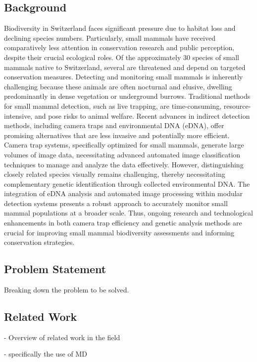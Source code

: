     \subsection{Background}
    Biodiversity in Switzerland faces significant pressure due to habitat loss and declining species numbers.
    Particularly, small mammals have received comparatively less attention in conservation research and public perception, despite their crucial ecological roles.
    Of the approximately 30 species of small mammals native to Switzerland, several are threatened and depend on targeted conservation measures.
    Detecting and monitoring small mammals is inherently challenging because these animals are often nocturnal and elusive, dwelling predominantly in dense vegetation or underground burrows.
    Traditional methods for small mammal detection, such as live trapping, are time-consuming, resource-intensive, and pose risks to animal welfare.
    Recent advances in indirect detection methods, including camera traps and environmental DNA (eDNA), offer promising alternatives that are less invasive and potentially more efficient.
    Camera trap systems, specifically optimized for small mammals, generate large volumes of image data, necessitating advanced automated image classification techniques to manage and analyze the data effectively.
    However, distinguishing closely related species visually remains challenging, thereby necessitating complementary genetic identification through collected environmental DNA.
    The integration of eDNA analysis and automated image processing within modular detection systems presents a robust approach to accurately monitor small mammal populations at a broader scale.
    Thus, ongoing research and technological enhancements in both camera trap efficiency and genetic analysis methods are crucial for improving small mammal biodiversity assessments and informing conservation strategies.

    \subsection{Problem Statement}

    Breaking down the problem to be solved.

    \subsection{Related Work}

    - Overview of related work in the field

    - specifically the use of MD

